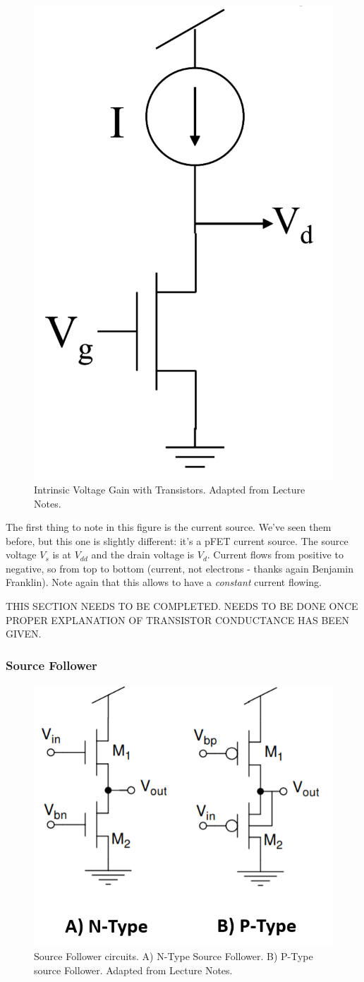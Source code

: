 \begin{figure}[H]
    \centering
    \includegraphics[width=0.2\linewidth]{../../Figures/Intrinsic_Voltage_Gain_Transistor.PNG}
    \caption{Intrinsic Voltage Gain with Transistors. Adapted from Lecture Notes.}
    \label{fig:basalandcerebellum}
\end{figure}

The first thing to note in this figure is the current source. We've seen them before, but this one is slightly different: it's a pFET current source. The source voltage $V_s$ is at $V_{dd}$ and the drain voltage is $V_d$. Current flows from positive to negative, so from top to bottom (current, not electrons - thanks again Benjamin Franklin). Note again that this allows to have a \emph{constant} current flowing. 

THIS SECTION NEEDS TO BE COMPLETED. NEEDS TO BE DONE ONCE PROPER EXPLANATION OF TRANSISTOR CONDUCTANCE HAS BEEN GIVEN. 

\subsubsection{Source Follower}

\begin{figure}[H]
    \centering
    \includegraphics[width=0.5\linewidth]{../../Figures/Source_Follower.PNG}
    \caption{Source Follower circuits. A) N-Type Source Follower. B) P-Type source Follower. Adapted from Lecture Notes.}
    \label{fig:basalandcerebellum}
\end{figure}

